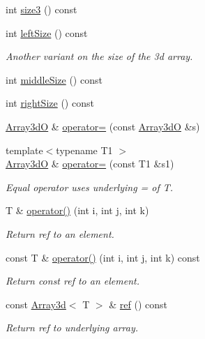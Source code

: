 \begin{DoxyCompactItemize}
int \mbox{\hyperlink{classADAT_1_1Array3dO_acd5ccea08cb9cde541a396823af21161}{size3}} () const
\item 
int \mbox{\hyperlink{classADAT_1_1Array3dO_a60f0fb62e8b93e6828fc98df271db054}{left\+Size}} () const
\begin{DoxyCompactList}\small\item\em Another variant on the size of the 3d array. \end{DoxyCompactList}\item 
int \mbox{\hyperlink{classADAT_1_1Array3dO_aff38cae908364701dc0fefd386223c55}{middle\+Size}} () const
\item 
int \mbox{\hyperlink{classADAT_1_1Array3dO_a81a9bfa7afe224267642e822ebe09457}{right\+Size}} () const
\item 
\mbox{\hyperlink{classADAT_1_1Array3dO}{Array3dO}} \& \mbox{\hyperlink{classADAT_1_1Array3dO_a11d4d9d221d7e6598675307926a38f4f}{operator=}} (const \mbox{\hyperlink{classADAT_1_1Array3dO}{Array3dO}} \&s)
\item 
{\footnotesize template$<$typename T1 $>$ }\\\mbox{\hyperlink{classADAT_1_1Array3dO}{Array3dO}} \& \mbox{\hyperlink{classADAT_1_1Array3dO_a7f1b73e1e34cf1e21dfac8af86469ee1}{operator=}} (const T1 \&s1)
\begin{DoxyCompactList}\small\item\em Equal operator uses underlying = of T. \end{DoxyCompactList}\item 
T \& \mbox{\hyperlink{classADAT_1_1Array3dO_a7707d5d50d59bd04eb784754e2128075}{operator()}} (int i, int j, int k)
\begin{DoxyCompactList}\small\item\em Return ref to an element. \end{DoxyCompactList}\item 
const T \& \mbox{\hyperlink{classADAT_1_1Array3dO_a3b4254a3812d8a02c4510f4fa635dd9c}{operator()}} (int i, int j, int k) const
\begin{DoxyCompactList}\small\item\em Return const ref to an element. \end{DoxyCompactList}\item 
const \mbox{\hyperlink{classXMLArray_1_1Array3d}{Array3d}}$<$ T $>$ \& \mbox{\hyperlink{classADAT_1_1Array3dO_a7ad48358af907cbaf3cf50fad298a088}{ref}} () const
\begin{DoxyCompactList}\small\item\em Return ref to underlying array. \end{DoxyCompactList}\item 

\end{DoxyCompactItemize}
